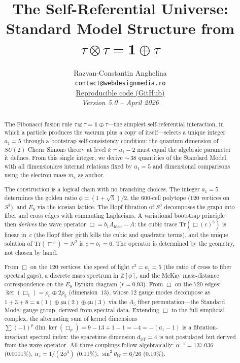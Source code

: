 \documentclass[12pt,a4paper]{article}
\title{\textbf{The Self-Referential Universe:\\
Standard Model Structure from $\tau \otimes \tau = \mathbf{1} \oplus \tau$}}
\author{
Razvan-Constantin Anghelina\\
\texttt{contact@webdesignmedia.ro}\\[0.3em]
\href{https://github.com/razvananghelina/One-Integer-Three-Generations}{Reproducible code (GitHub)}\\[1em]
\textit{Version 5.0 -- April 2026}
}
\date{}
\theoremstyle{definition}
\begin{document}
\maketitle

\begin{abstract}
The Fibonacci fusion rule $\tau \otimes \tau = \mathbf{1} \oplus \tau$---the simplest self-referential interaction, in which a particle produces the vacuum plus a copy of itself---selects a unique integer $a_1 = 5$ through a bootstrap self-consistency condition: the quantum dimension of $SU(2)$ Chern--Simons theory at level $k = a_1 - 2$ must equal the algebraic parameter it defines.  From this single integer, we derive ${\sim}\,38$ quantities of the Standard Model, with all dimensionless internal relations fixed by $a_1 = 5$ and dimensional comparisons using the electron mass $m_e$ as anchor.

The construction is a logical chain with no branching choices.  The integer $a_1 = 5$ determines the golden ratio $\phi = (1+\sqrt{5})/2$, the 600-cell polytope ($120$ vertices on $S^3$), and $E_8$ via the icosian lattice.  The Hopf fibration of $S^3$ decomposes the graph into fiber and cross edges with commuting Laplacians.  A variational bootstrap principle then \emph{derives} the wave operator $\Box = b_1 A_{\mathrm{fiber}} - A$: the cubic trace $\mathrm{Tr}(\Box(c)^3)$ is linear in~$c$ (the Hopf fiber girth kills the cubic and quadratic terms), and the unique solution of $\mathrm{Tr}(\Box^3) = N^2$ is $c = b_1 = 6$.  The operator is determined by the geometry, not chosen by hand.

From $\Box$ on the 120 vertices: the speed of light $c^2 = a_1 = 5$ (the ratio of cross to fiber spectral gaps), a discrete mass spectrum in $\mathbb{Z}[\phi]$, and the McKay mass-distance correspondence on the $E_8$ Dynkin diagram ($r = 0.93$).  From $\Box$ on the 720 edges: $\ker(\Box_1) = \rho_0 \oplus 2\rho_5$ (dimension~$13$), whose 12 gauge modes decompose as $1 + 3 + 8 = \mathfrak{u}(1) \oplus \mathfrak{su}(2) \oplus \mathfrak{su}(3)$ via the $A_5$ fiber permutation---the Standard Model gauge group, derived from spectral data.  Extending $\Box$ to the full simplicial complex, the alternating sum of kernel dimensions $\sum(-1)^p\dim\ker(\Box_p) = 9 - 13 + 1 - 1 = -4 = -(a_1-1)$ is a fibration-invariant spectral index: the spacetime dimension $d_{\mathrm{ST}} = 4$ is not postulated but derived from the wave operator.  All three couplings follow algebraically: $\alpha^{-1} = 137.036$ (0.0001\%), $\alpha_s = 1/(2\phi^3)$ (0.11\%), $\sin^2\theta_W = 6/26$ (0.19\%).


\end{abstract}
\end{document}
